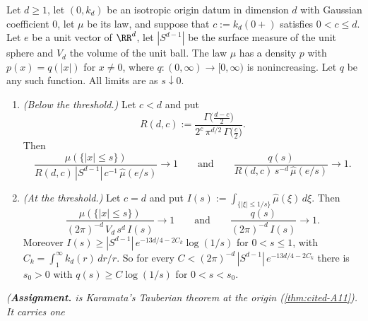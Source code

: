 \begin{proposition}
\label{prop:origin-rate-d}
\leanok
Let $d \ge 1$, let $(0, k_d)$ be an isotropic origin datum in dimension $d$ with Gaussian
coefficient $0$, let $\mu$ be its law, and suppose that $c := k_d(0{+})$ satisfies $0 < c \le d$.
Let $e$ be a unit vector of $\RR^d$, let $|S^{d-1}|$ be the surface measure of the unit sphere and
$V_d$ the volume of the unit ball. The law $\mu$ has a density $p$ with $p(x) = q(|x|)$ for
$x \ne 0$, where $q : (0,\infty) \to [0,\infty)$ is nonincreasing. Let $q$ be any such function.
All limits are as $s \downarrow 0$.
\begin{enumerate}
\item \emph{(Below the threshold.)} Let $c < d$ and put
\[
  R(d,c) := \frac{\Gamma\bigl(\tfrac{d-c}{2}\bigr)}{2^{c}\,\pi^{d/2}\,\Gamma\bigl(\tfrac c2\bigr)} .
\]
Then
\[
  \frac{\mu(\{|x| \le s\})}{R(d,c)\,|S^{d-1}|\,c^{-1}\,\widehat\mu(e/s)} \to 1
  \qquad\text{and}\qquad
  \frac{q(s)}{R(d,c)\,s^{-d}\,\widehat\mu(e/s)} \to 1 .
\]
\item \emph{(At the threshold.)} Let $c = d$ and put
$I(s) := \int_{\{|\xi| \le 1/s\}}\widehat\mu(\xi)\,d\xi$. Then
\[
  \frac{\mu(\{|x| \le s\})}{(2\pi)^{-d}\,V_d\,s^{d}\,I(s)} \to 1
  \qquad\text{and}\qquad
  \frac{q(s)}{(2\pi)^{-d}\,I(s)} \to 1 .
\]
Moreover $I(s) \ge |S^{d-1}|\,e^{-13d/4 - 2C_k}\log(1/s)$ for $0 < s \le 1$, with
$C_k = \int_1^\infty k_d(r)\,dr/r$. So for every
$C < (2\pi)^{-d}\,|S^{d-1}|\,e^{-13d/4 - 2C_k}$ there is $s_0 > 0$ with
$q(s) \ge C\log(1/s)$ for $0 < s < s_0$.
\end{enumerate}
\statusA\quad{}\quad{}\quad{}\quad{}\quad\emph{(\textbf{Assignment.}
 is Karamata's Tauberian theorem at the origin (\ref{thm:cited-A11}). It carries one
}
\end{proposition}
